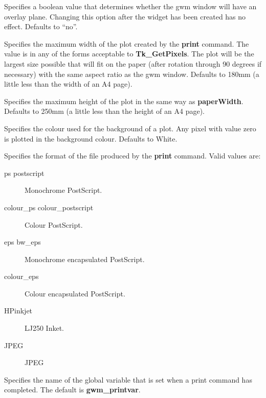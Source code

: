 \begin{rquote}
Specifies a boolean value that determines whether the gwm window will have
an overlay plane.  Changing this option after the widget
has been created has no effect. Defaults to ``no''.
\end{rquote}

\begin{rquote}
Specifies the maximum width of the plot created by the {\bf print} command.
The value is in any of the forms acceptable to {\bf Tk\_GetPixels}. The
plot will be the largest size possible that will fit on the paper (after
rotation through 90 degrees if necessary) with the same aspect ratio
as the gwm window. Defaults to 180mm (a little less than the width of an
A4 page).
\end{rquote}

\begin{rquote}
Specifies the maximum height of the plot in the same way as {\bf paperWidth}.
Defaults to 250mm (a little less than the height of an A4 page).
\end{rquote}

\begin{rquote}
Specifies the colour used for the background of a plot. Any pixel with
value zero is plotted in the background colour. Defaults to White.
\end{rquote}

\begin{rquote}
Specifies the format of the file produced by the {\bf print} command. Valid
values are:
\begin{description}
\item[ps postscript] Monochrome PostScript.
\item[colour\_ps colour\_postscript] Colour PostScript.
\item[eps bw\_eps] Monochrome encapsulated PostScript.
\item[colour\_eps] Colour encapsulated PostScript.
\item[HPinkjet] LJ250 Inket.
\item[JPEG] JPEG
\end{description}
\end{rquote}

\begin{rquote}
Specifies the name of the global variable that is set when a print command
has completed. The default is {\bf gwm\_printvar}.
\end{rquote}

